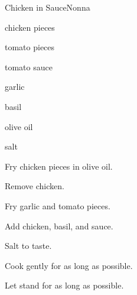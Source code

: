 \begin{recipe}{Chicken in Sauce}{Nonna}{}

\begin{ingredients}
\item chicken pieces
\item tomato pieces
\item tomato sauce
\item garlic
\item basil
\item olive oil
\item salt
\end{ingredients}

\begin{directions}
\item Fry chicken pieces in olive oil.
\item Remove chicken.
\item Fry garlic and tomato pieces.
\item Add chicken, basil, and sauce.
\item Salt to taste.
\item Cook gently for as long as possible.
\item Let stand for as long as possible.
\end{directions}

\end{recipe}
